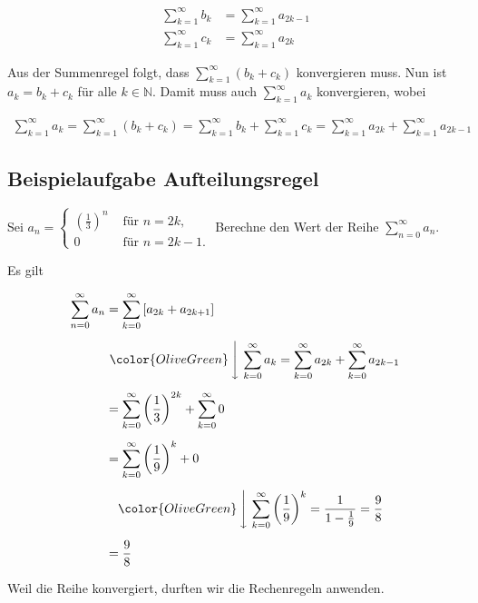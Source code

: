 \documentclass[fontsize=9pt,
               parskip=half-,
               DIV=14,
               listof=chapterentry,
               tocflat]{scrbook}
\begin{document}
\begin{proof*}
\begin{align*}
\sum _{k=1}^{\infty }b_{k}&=\sum _{k=1}^{\infty }a_{2k-1}\\[0.5em]\sum _{k=1}^{\infty }c_{k}&=\sum _{k=1}^{\infty }a_{2k}
\end{align*}

Aus der Summenregel folgt, dass $\sum _{k=1}^{\infty }(b_{k}+c_{k})$ konvergieren muss. Nun ist $a_{k}=b_{k}+c_{k}$ für alle $k\in \mathbb {N} $. Damit muss auch $\sum _{k=1}^{\infty }a_{k}$ konvergieren, wobei

\begin{align*}
\sum _{k=1}^{\infty }a_{k}=\sum _{k=1}^{\infty }(b_{k}+c_{k})=\sum _{k=1}^{\infty }b_{k}+\sum _{k=1}^{\infty }c_{k}=\sum _{k=1}^{\infty }a_{2k}+\sum _{k=1}^{\infty }a_{2k-1}
\end{align*}

\end{proof*}

\subsection{Beispielaufgabe Aufteilungsregel}

\begin{exercise*}
Sei $a_{n}={\begin{cases}({\frac {1}{3}})^{n}&{\text{ für }}n=2k,\\0&{\text{ für }}n=2k-1.\end{cases}}$ Berechne den Wert der Reihe $\sum _{n=0}^{\infty }a_{n}$.

\end{exercise*}

\begin{solution*}
Es gilt

\begin{align*}
\sum _{n=0}^{\infty }a_{n}&=\sum _{k=0}^{\infty }\left[a_{2k}+a_{2k+1}\right]\\[0.5em]&\ {\color {OliveGreen}\left\downarrow \ \sum _{k=0}^{\infty }a_{k}=\sum _{k=0}^{\infty }a_{2k}+\sum _{k=0}^{\infty }a_{2k-1}\right.}\\[0.5em]&=\sum _{k=0}^{\infty }\left({\frac {1}{3}}\right)^{2k}+\sum _{k=0}^{\infty }0\\[0.5em]&=\sum _{k=0}^{\infty }\left({\frac {1}{9}}\right)^{k}+0\\[0.5em]&\quad {\color {OliveGreen}\left\downarrow \ \sum _{k=0}^{\infty }\left({\frac {1}{9}}\right)^{k}={\frac {1}{1-{\frac {1}{9}}}}={\frac {9}{8}}\right.}\\[0.5em]&={\frac {9}{8}}
\end{align*}

Weil die Reihe konvergiert, durften wir die Rechenregeln anwenden.

\end{solution*}
\end{document}
